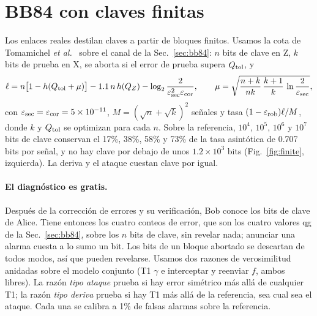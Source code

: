 \documentclass[11pt]{article}
\begin{document}
\section{BB84 con claves finitas}\label{sec:finite}

Los enlaces reales destilan claves a partir de bloques finitos. Usamos la cota de Tomamichel \emph{et
al.}~\cite{tomamichel2012} sobre el canal de la Sec.~\ref{sec:bb84}: $n$ bits de clave en Z, $k$ bits de
prueba en X, se aborta si el error de prueba supera $Q_{\rm tol}$, y
\begin{equation}
\ell=n\big[1-h(Q_{\rm tol}+\mu)\big]-1.1\,n\,h(Q_Z)-\log_2\frac{2}{\varepsilon_{\rm sec}^2\varepsilon_{\rm cor}},\qquad
\mu=\sqrt{\frac{n+k}{nk}\,\frac{k+1}{k}\,\ln\frac{2}{\varepsilon_{\rm sec}}},
\end{equation}
con $\varepsilon_{\rm sec}=\varepsilon_{\rm cor}=5\times10^{-11}$, $M=(\sqrt n+\sqrt k)^2$ señales y tasa
$(1-\varepsilon_{\rm rob})\ell/M$, donde $k$ y $Q_{\rm tol}$ se optimizan para cada $n$. Sobre la referencia,
$10^4$, $10^5$, $10^6$ y $10^7$ bits de clave conservan el 17\%, 38\%, 58\% y 73\% de la tasa asintótica de
0.707 bits por señal, y no hay clave por debajo de unos $1.2\times10^3$ bits (Fig.~\ref{fig:finite},
izquierda). La deriva y el ataque cuestan clave por igual.

\paragraph{El diagnóstico es gratis.} Después de la corrección de errores y su verificación, Bob conoce
los bits de clave de Alice. Tiene entonces los cuatro conteos de error, que son los cuatro valores qg de la
Sec.~\ref{sec:bb84}, sobre los $n$ bits de clave, sin revelar nada; anunciar una alarma cuesta a lo sumo
un bit. Los bits de un bloque abortado se descartan de todos modos, así que pueden revelarse. Usamos dos
razones de verosimilitud anidadas sobre el modelo conjunto (T1 $\gamma$ e interceptar y reenviar $f$,
ambos libres). La razón \emph{tipo ataque} prueba si hay error simétrico más allá de cualquier T1; la razón
\emph{tipo deriva} prueba si hay T1 más allá de la referencia, sea cual sea el ataque. Cada una se calibra
a 1\% de falsas alarmas sobre la referencia.
\end{document}

